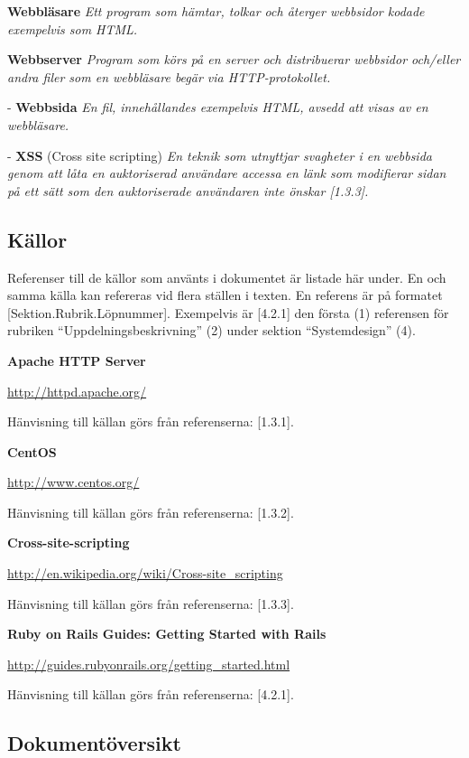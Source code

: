 \documentclass[a4paper, twoside, 11pt, titlepage]{article}
\begin{document}
	\textbf{Webbläsare} \emph{Ett program som hämtar, tolkar och återger webbsidor kodade exempelvis som HTML.}

	\textbf{Webbserver} \emph{Program som körs på en server och distribuerar webbsidor och/eller andra filer som en webbläsare begär via HTTP-protokollet.}

	- \textbf{Webbsida} \emph{En fil, innehållandes exempelvis HTML, avsedd att visas av en webbläsare.}

	- \textbf{XSS} (Cross site scripting) \emph{En teknik som utnyttjar svagheter i en webbsida genom att låta en auktoriserad användare accessa en länk som modifierar sidan på ett sätt som den auktoriserade användaren inte önskar [1.3.3].}

	\subsection{Källor}


	Referenser till de källor som använts i dokumentet är listade här under. En och samma källa kan refereras vid flera ställen i texten. En referens är på formatet [Sektion.Rubrik.Löpnummer]. Exempelvis är [4.2.1] den första (1) referensen för rubriken ``Uppdelningsbeskrivning'' (2) under sektion ``Systemdesign'' (4).

	\textbf{Apache HTTP Server}

	\url{http://httpd.apache.org/}

	Hänvisning till källan görs från referenserna: [1.3.1].

	\textbf{CentOS}

	\url{http://www.centos.org/}

	Hänvisning till källan görs från referenserna: [1.3.2].

	\textbf{Cross-site-scripting}

	\url{http://en.wikipedia.org/wiki/Cross-site_scripting}

	Hänvisning till källan görs från referenserna: [1.3.3].

	\textbf{Ruby on Rails Guides: Getting Started with Rails}

	\url{http://guides.rubyonrails.org/getting_started.html}

	Hänvisning till källan görs från referenserna: [4.2.1].

	\subsection{Dokumentöversikt}
\end{document}
